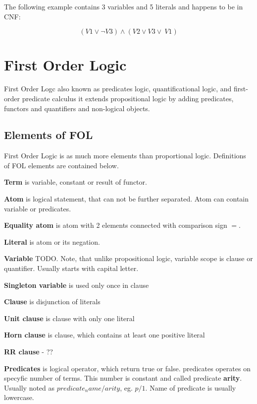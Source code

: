 The following example contains 3 variables and 5 literals and happens to be in \gls{CNF}:

\begin{equation} \label{eg:PL_1}
  (V1 \lor \neg V3) \land (V2 \lor  V3 \lor ~V1)
\end{equation}


\section{First Order Logic}

First Order Logc also known as predicates logic, quantificational logic, and first-order predicate calculus it extends propositional logic by adding predicates, functors and quantifiers and non-logical objects.

\subsection{Elements of FOL}

First Order Logic is as much more elements than proportional logic. Definitions of FOL elements are contained below.

\textbf{Term}
is variable, constant or result of functor.

\textbf{Atom}
is logical statement, that can not be further separated. Atom can contain variable or predicates.

\textbf{Equality atom}
is atom with 2 elements connected with comparison sign $=$.

\textbf{Literal}
is atom or its negation.

\textbf{Variable}
TODO. Note, that unlike propositional logic, variable scope is clause or quantifier. Usually starts with capital letter.

\textbf{Singleton variable}
is used only once in clause

\textbf{Clause}
is disjunction of literals

\textbf{Unit clause}
is clause with only one literal

\textbf{Horn clause}
is clause, which contains at least one positive literal

\textbf{RR clause} - ??

\textbf{Predicates}
is logical operator, which return true or false. predicates operates on specyfic number of terms. This number is constant and called predicate \textbf{arity}. Usually noted as $predicate_name/arity$, eg. $p/1$. Name of predicate is usually lowercase.


